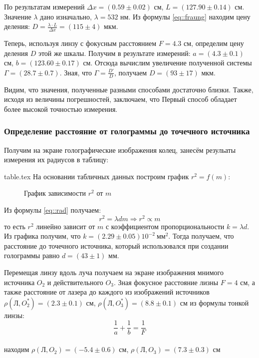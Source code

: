         По результатам измерений $\Delta x = (0.59 \pm 0.02)$ см, $L = (127.90 \pm 0.14)$ см.
        Значение $\lambda$ дано изначально, $\lambda = 532$ нм. 
        Из формулы \eqref{eq::fraung} находим цену деления: $D = \frac{\lambda \cdot L}{\Delta x} = (115 \pm 4)$ мкм.

        Теперь, используя линзу с фокусным расстоянием $F = 4.3$ см, определим 
        цену деления $D$ этой же шкалы. Получим в результате измерений:
        $a = (4.3 \pm 0.1)$ см, $b = (123.60 \pm 0.17)$ см.
        Отсюда вычислим увеличение полученной системы $\Gamma = (28.7 \pm 0.7)$.
        Зная, что $\Gamma = \frac{D'}{D}$, получаем $D = (93 \pm 17)$ мкм.

        Видим, что значения, полученные разными способами достаточно близки.
        Также, исходя из величины погрешностей, заключаем, что 
        Первый способ обладает более высокой точностью измерения.

    \subsubsection*{Определение расстояние от голограммы до точечного источника}

        Получим на экране голографические изображения колец, занесём резульаты 
        измерения их радиусов в таблицу:


        {table.tex}
        На основании табличных данных построим график $r^2 = f(m)$:
        \begin{figure}[h!]
            \caption{График зависимости $r^2$ от $m$}
        \end{figure}

        Из формулы \eqref{eq::rad} получаем:
        $$
        r^2 = \lambda d m \Rightarrow r^2 \propto m
        $$
        то есть $r^2$ линейно зависит от $m$ с коэффициентом пропорциональности
        $k = \lambda d$. Из графика получим, что $k = (2.29 \pm 0.05) 10^{-2} \: мм^2$.
        Тогда получаем, что расстояние до точечного источника, который 
        использовался при создании голограммы равно $d = (43 \pm 1)$ мм.

        Перемещая линзу вдоль луча получаем на экране изображения мнимого источника $O_2$
        и действительного $O_3$. Зная фокусное расстояние лизны $F = 4$ см, а также 
        расстояние от лазера до каждого из изображений источников 
        $\rho(\text{Л}, O_2^*) = (2.3 \pm 0.1)$ см,
        $\rho(\text{Л}, O_3^*) = (8.8 \pm 0.1)$ см из формулы тонкой линзы: 
        \\
        $$
        \frac{1}{a} + \frac{1}{b} = \frac{1}{F}
        $$
        \\
        находим $\rho(\text{Л}, O_2) = (-5.4 \pm 0.6)$ см,
        $\rho(\text{Л}, O_3) = (7.3 \pm 0.3)$ см

